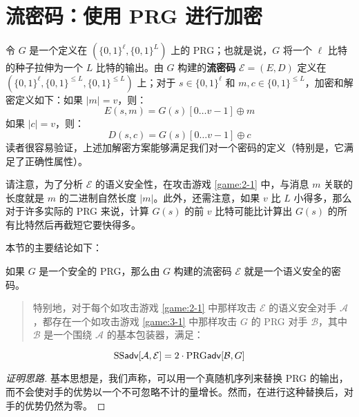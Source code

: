 \section{流密码：使用 PRG 进行加密}\label{sec:3-2}

令 $G$ 是一个定义在 $(\{0,1\}^\ell,\{0,1\}^L)$ 上的 PRG；也就是说，$G$ 将一个 $\ell$ 比特的种子拉伸为一个 $L$ 比特的输出。由 $G$ 构建的\textbf{流密码} $\mathcal E=(E,D)$ 定义在 $(\{0,1\}^\ell,\{0,1\}^{\leq L},\{0,1\}^{\leq L})$ 上；对于 $s\in\{0,1\}^\ell$ 和 $m,c\in\{0,1\}^{\leq L}$，加密和解密定义如下：如果 $|m|=v$，则：
\[
E(s,m)=G(s)[0\dots v-1]\oplus m
\]
如果 $|c| = v$，则：
\[
D(s,c)=G(s)[0\dots v-1]\oplus c
\]
读者很容易验证，上述加解密方案能够满足我们对一个密码的定义（特别是，它满足了正确性属性）。

请注意，为了分析 $\mathcal E$ 的语义安全性，在攻击游戏 \ref{game:2-1} 中，与消息 $m$ 关联的长度就是 $m$ 的二进制自然长度 $|m|$。此外，还需注意，如果 $v$ 比 $L$ 小得多，那么对于许多实际的 PRG 来说，计算 $G(s)$ 的前 $v$ 比特可能比计算出 $G(s)$ 的所有比特然后再截短它要快得多。

本节的主要结论如下：

\begin{theorem}\label{theo:3-1}
如果 $G$ 是一个安全的 PRG，那么由 $G$ 构建的流密码 $\mathcal E$ 就是一个语义安全的密码。
\begin{quote}
特别地，对于每个如攻击游戏 \ref{game:2-1} 中那样攻击 $\mathcal E$ 的语义安全对手 $\mathcal A$，都存在一个如攻击游戏 \ref{game:3-1} 中那样攻击 $G$ 的 PRG 对手 $\mathcal B$，其中 $\mathcal B$ 是一个围绕 $\mathcal A$ 的基本包装器，满足：
\end{quote}
\begin{equation}\label{eq:3-2}
{\rm SS\mathsf{adv}}[\mathcal{A},\mathcal{E}]=2\cdot{\rm PRG\mathsf{adv}}[\mathcal{B},G]
\end{equation}
\end{theorem}

\begin{proof}[证明思路]
基本思想是，我们声称，可以用一个真随机序列来替换 PRG 的输出，而不会使对手的优势以一个不可忽略不计的量增长。然而，在进行这种替换后，对手的优势仍然为零。
\end{proof}


